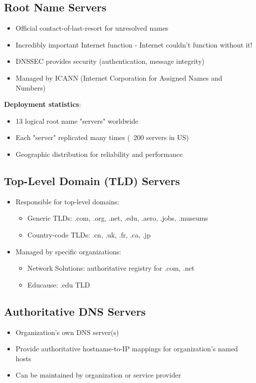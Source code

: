 \documentclass[12pt]{article}
\begin{document}
\subsection{Root Name Servers}

\begin{itemize}
    \item Official contact-of-last-resort for unresolved names
    \item Incredibly important Internet function - Internet couldn't function without it!
    \item DNSSEC provides security (authentication, message integrity)
    \item Managed by ICANN (Internet Corporation for Assigned Names and Numbers)
\end{itemize}

\textbf{Deployment statistics}:
\begin{itemize}
    \item 13 logical root name "servers" worldwide
    \item Each "server" replicated many times (~200 servers in US)
    \item Geographic distribution for reliability and performance
\end{itemize}

\subsection{Top-Level Domain (TLD) Servers}
\begin{itemize}
    \item Responsible for top-level domains:
          \begin{itemize}
              \item Generic TLDs: .com, .org, .net, .edu, .aero, .jobs, .museums
              \item Country-code TLDs: .cn, .uk, .fr, .ca, .jp
          \end{itemize}
    \item Managed by specific organizations:
          \begin{itemize}
              \item Network Solutions: authoritative registry for .com, .net
              \item Educause: .edu TLD
          \end{itemize}
\end{itemize}

\subsection{Authoritative DNS Servers}
\begin{itemize}
    \item Organization's own DNS server(s)
    \item Provide authoritative hostname-to-IP mappings for organization's named hosts
    \item Can be maintained by organization or service provider
\end{itemize}
\end{document}
